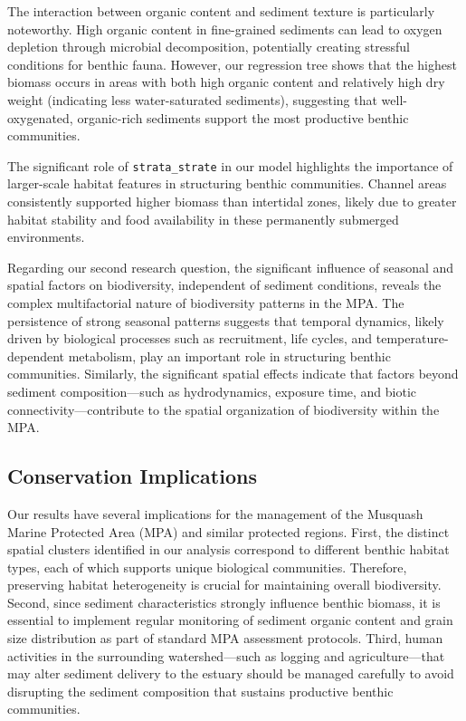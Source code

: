 \documentclass[12pt]{article}
\begin{document}
\qquad The interaction between organic content and sediment texture is particularly noteworthy. High organic content in fine-grained sediments can lead to oxygen depletion through microbial decomposition, potentially creating stressful conditions for benthic fauna. However, our regression tree shows that the highest biomass occurs in areas with both high organic content and relatively high dry weight (indicating less water-saturated sediments), suggesting that well-oxygenated, organic-rich sediments support the most productive benthic communities.

\qquad The significant role of \texttt{strata\_strate} in our model highlights the importance of larger-scale habitat features in structuring benthic communities. Channel areas consistently supported higher biomass than intertidal zones, likely due to greater habitat stability and food availability in these permanently submerged environments.

\qquad Regarding our second research question, the significant influence of seasonal and spatial factors on biodiversity, independent of sediment conditions, reveals the complex multifactorial nature of biodiversity patterns in the MPA. The persistence of strong seasonal patterns suggests that temporal dynamics, likely driven by biological processes such as recruitment, life cycles, and temperature-dependent metabolism, play an important role in structuring benthic communities. Similarly, the significant spatial effects indicate that factors beyond sediment composition—such as hydrodynamics, exposure time, and biotic connectivity—contribute to the spatial organization of biodiversity within the MPA.

\subsection{Conservation Implications}

\qquad Our results have several implications for the management of the Musquash Marine Protected Area (MPA) and similar protected regions. First, the distinct spatial clusters identified in our analysis correspond to different benthic habitat types, each of which supports unique biological communities. Therefore, preserving habitat heterogeneity is crucial for maintaining overall biodiversity. Second, since sediment characteristics strongly influence benthic biomass, it is essential to implement regular monitoring of sediment organic content and grain size distribution as part of standard MPA assessment protocols. Third, human activities in the surrounding watershed—such as logging and agriculture—that may alter sediment delivery to the estuary should be managed carefully to avoid disrupting the sediment composition that sustains productive benthic communities.
\end{document}
